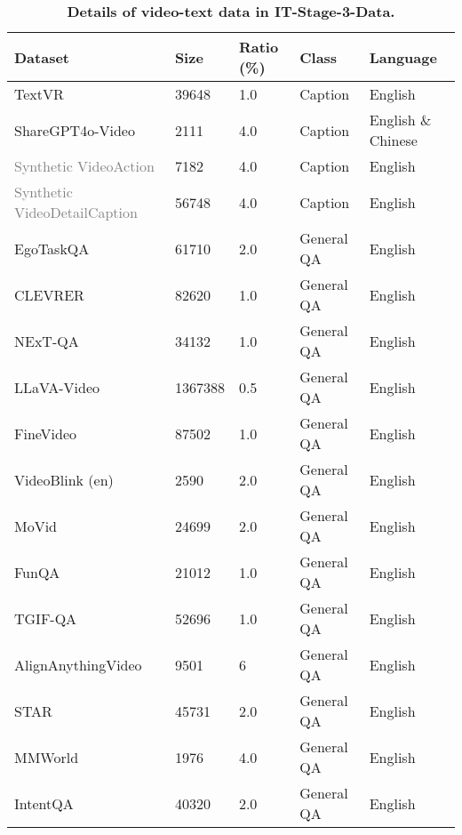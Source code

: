 \begin{table}[h]
\centering
\caption{\textbf{Details of video-text data in IT-Stage-3-Data.}}
\label{tab:video_text_stage3}
\setlength{\tabcolsep}{7pt}
\begin{tabular}{l|l|l|l|l}
\hline
Dataset & Size & Ratio (\%) & Class & Language \\
\hline
TextVR~\cite{wu2023largecrossmodal} & 39648 & 1.0 & Caption & English \\
ShareGPT4o-Video~\cite{chen2024far} & 2111 & 4.0 & Caption & English \& Chinese \\
\textcolor{gray}{Synthetic VideoAction} & 7182 & 4.0 & Caption & English \\
\textcolor{gray}{Synthetic VideoDetailCaption} & 56748 & 4.0 & Caption & English \\
EgoTaskQA~\cite{jia2022egotaskqa} & 61710 & 2.0 & General QA & English \\
CLEVRER~\cite{yi2019clevrer} & 82620 & 1.0 & General QA & English \\
NExT-QA~\cite{xiao2021next} & 34132 & 1.0 & General QA & English \\
LLaVA-Video~\cite{zhang2024video} & 1367388 & 0.5 & General QA & English \\
FineVideo~\cite{FineVideo} & 87502 & 1.0 & General QA & English \\
VideoBlink (en)~\cite{videoblink} & 2590 & 2.0 & General QA & English \\
MoVid~\cite{chen2024motionllm} & 24699 & 2.0 & General QA & English \\
FunQA~\cite{xie2024funqa} & 21012 & 1.0 & General QA & English \\
TGIF-QA~\cite{yuntgifqa} & 52696 & 1.0 & General QA & English \\
AlignAnythingVideo~\cite{ji2024alignanything} & 9501 & 6 & General QA & English \\
STAR~\cite{wu2024starbench} & 45731 & 2.0 & General QA & English \\
MMWorld~\cite{he2024mmworld} & 1976 & 4.0 & General QA & English \\
IntentQA~\cite{Li0HF23} & 40320 & 2.0 & General QA & English \\
\hline
\end{tabular}
\end{table}


